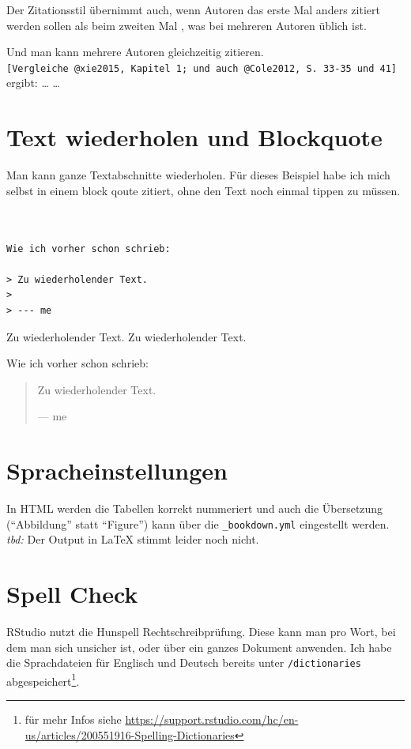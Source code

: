 \documentclass[]{book}
\let\rmarkdownfootnote\footnote%
\def\footnote{\protect\rmarkdownfootnote}
\theoremstyle{definition}
\theoremstyle{definition}
\theoremstyle{remark}
\begin{document}
Der Zitationsstil übernimmt auch, wenn Autoren das erste Mal anders
zitiert werden sollen \citep{Cole2012} als beim zweiten Mal
\citep{Cole2012}, was bei mehreren Autoren üblich ist.

Und man kann mehrere Autoren gleichzeitig zitieren.\\
\texttt{{[}Vergleiche\ @xie2015,\ Kapitel\ 1;\ und\ auch\ @Cole2012,\ S.\ 33-35\ und\ 41{]}}
ergibt: \ldots{} \citetext{\citealp[Vergleiche][Kapitel
1]{xie2015}; \citealp[und auch][S. 33-35 und 41]{Cole2012}} \ldots{}

\section{Text wiederholen und
Blockquote}\label{text-wiederholen-und-blockquote}

Man kann ganze Textabschnitte wiederholen. Für dieses Beispiel habe ich
mich selbst in einem block qoute zitiert, ohne den Text noch einmal
tippen zu müssen.

\begin{verbatim}


Wie ich vorher schon schrieb:

> Zu wiederholender Text.
>
> --- me
\end{verbatim}

Zu wiederholender Text. Zu wiederholender Text.

Wie ich vorher schon schrieb:

\begin{quote}
Zu wiederholender Text.

--- me
\end{quote}

\section{Spracheinstellungen}\label{spracheinstellungen}

In HTML werden die Tabellen korrekt nummeriert und auch die Übersetzung
(``Abbildung'' statt ``Figure'') kann über die \texttt{\_bookdown.yml}
eingestellt werden. \emph{tbd:} Der Output in LaTeX stimmt leider noch
nicht.

\section{Spell Check}\label{spell-check}

RStudio nutzt die Hunspell Rechtschreibprüfung. Diese kann man pro Wort,
bei dem man sich unsicher ist, oder über ein ganzes Dokument anwenden.
Ich habe die Sprachdateien für Englisch und Deutsch bereits unter
\texttt{/dictionaries} abgespeichert\footnote{für mehr Infos siehe
  \url{https://support.rstudio.com/hc/en-us/articles/200551916-Spelling-Dictionaries}}.
\end{document}
